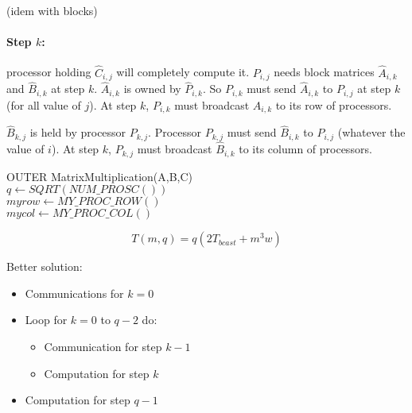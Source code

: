 \begin{algorithm}[H]
\end{algorithm}

(idem with blocks)

\paragraph{Step $k$:} processor holding $\hat{C}_{i,j}$ will completely compute it. $P_{i,j}$ needs block matrices $\hat{A}_{i,k}$ and $\hat{B}_{i,k}$ at step $k$. $\hat{A}_{i,k}$ is owned by $\hat{P}_{i,k}$. So $P_{i,k}$ must send  $\hat{A}_{i,k}$ to $P_{i,j}$ at step $k$ (for all value of $j$). At step $k$, $P_{i,k}$ must broadcast $A_{i,k}$ to its row of processors.

$\hat{B}_{k,j}$ is held by processor $P_{k,j}$. Processor $P_{k,j}$ must send  $\hat{B}_{i,k}$ to $P_{i,j}$ (whatever the value of $i$). At step $k$, $P_{k,j}$ must broadcast  $\hat{B}_{i,k}$ to its column of processors.


\begin{algorithm}[H]
OUTER MatrixMultiplication(A,B,C)\\
$q\leftarrow SQRT(NUM\_PROSC())$\\
$myrow\leftarrow MY\_PROC\_ROW()$\\
$mycol\leftarrow MY\_PROC\_COL()$\\
\end{algorithm}
\[T(m,q)=q(2T_{bcast}+m^3w)\]

Better solution:
\begin{itemize}
\item Communications for $k=0$
\item Loop for $k=0$ to $q-2$ do:
\begin{itemize}
\item Communication for step $k-1$
\item Computation for step $k$
\end{itemize}
\item Computation for step $q-1$
\end{itemize}

